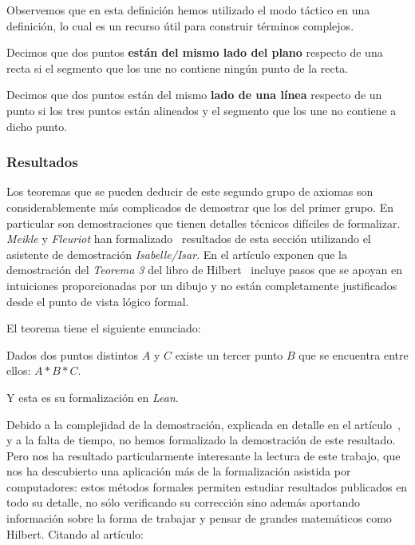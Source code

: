 Observemos que en esta definición hemos utilizado el modo táctico en una
definición, lo cual es un recurso útil para construir términos complejos.

\begin{defin*}
	Decimos que dos puntos \textbf{están del mismo lado del plano} respecto de una
	recta si el segmento que los une no contiene ningún punto de la recta.
\end{defin*}


\begin{defin*}
	Decimos que dos puntos están del mismo \textbf{lado de una línea} respecto
	de un punto si los tres puntos están alineados y el segmento que los une no
	contiene a dicho punto.
\end{defin*}


\subsubsection{Resultados}%

Los teoremas que se pueden deducir de este segundo grupo de axiomas son
considerablemente más complicados de demostrar que los del primer grupo. En
particular son demostraciones que tienen detalles técnicos difíciles de
formalizar. \textit{Meikle} y \textit{Fleuriot} han
formalizado~\cite{meikleFormalizingHilbertGrundlagen2003} resultados de esta
sección utilizando el asistente de demostración \textit{Isabelle/Isar}. En el
artículo exponen que la demostración del \textit{Teorema 3} del libro de
Hilbert~\cite{hilbertFoundationsGeometry} incluye pasos que se apoyan en
intuiciones proporcionadas por un dibujo y no están completamente justificados
desde el punto de vista lógico formal.

El teorema tiene el siguiente enunciado:

\setcounter{tma}{2}
\begin{tma}
	Dados dos puntos distintos $A$ y $C$ existe un tercer punto $B$ que se
	encuentra entre ellos: $A * B * C$.
\end{tma}

Y esta es su formalización en \textit{Lean}.


Debido a la complejidad de la demostración, explicada en detalle en el
artículo~\cite{meikleFormalizingHilbertGrundlagen2003}, y a la falta de tiempo,
no hemos formalizado la demostración de este resultado. Pero nos ha resultado
particularmente interesante la lectura de este trabajo, que nos ha descubierto
una aplicación más de la formalización asistida por computadores: estos métodos
formales permiten estudiar resultados publicados en todo su detalle,
no sólo verificando su corrección sino además aportando información sobre la
forma de trabajar y pensar de grandes matemáticos como Hilbert. Citando al
artículo:

